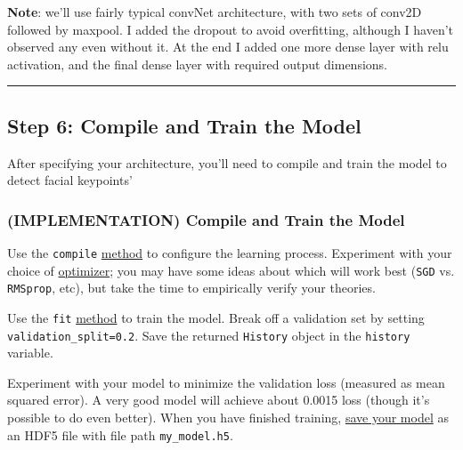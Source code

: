 \documentclass[11pt]{article}
\begin{document}
    \textbf{Note}: we'll use fairly typical convNet architecture, with two
sets of conv2D followed by maxpool. I added the dropout to avoid
overfitting, although I haven't observed any even without it. At the end
I added one more dense layer with relu activation, and the final dense
layer with required output dimensions.

    \begin{center}\rule{0.5\linewidth}{\linethickness}\end{center}

\hypertarget{step-6-compile-and-train-the-model}{%
\subsection{Step 6: Compile and Train the
Model}\label{step-6-compile-and-train-the-model}}

After specifying your architecture, you'll need to compile and train the
model to detect facial keypoints'

    \hypertarget{implementation-compile-and-train-the-model}{%
\subsubsection{(IMPLEMENTATION) Compile and Train the
Model}\label{implementation-compile-and-train-the-model}}

Use the \texttt{compile}
\href{https://keras.io/models/sequential/\#sequential-model-methods}{method}
to configure the learning process. Experiment with your choice of
\href{https://keras.io/optimizers/}{optimizer}; you may have some ideas
about which will work best (\texttt{SGD} vs. \texttt{RMSprop}, etc), but
take the time to empirically verify your theories.

Use the \texttt{fit}
\href{https://keras.io/models/sequential/\#sequential-model-methods}{method}
to train the model. Break off a validation set by setting
\texttt{validation\_split=0.2}. Save the returned \texttt{History}
object in the \texttt{history} variable.

Experiment with your model to minimize the validation loss (measured as
mean squared error). A very good model will achieve about 0.0015 loss
(though it's possible to do even better). When you have finished
training,
\href{https://keras.io/getting-started/faq/\#how-can-i-save-a-keras-model}{save
your model} as an HDF5 file with file path \texttt{my\_model.h5}.
\end{document}
